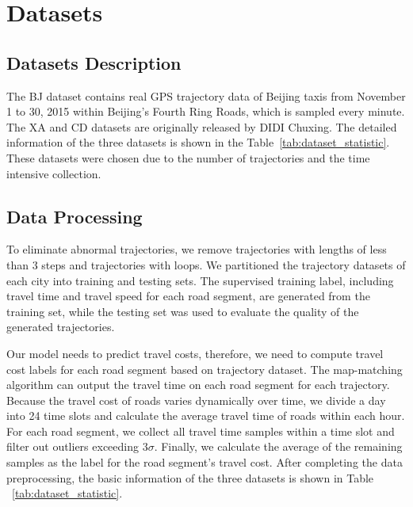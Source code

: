\section{Datasets}
\subsection{Datasets Description}
\label{apdx:data_desc}
The BJ dataset contains real GPS trajectory data of Beijing taxis from November 1 to 30, 2015 within Beijing’s Fourth Ring Roads, which is sampled every minute. The XA and CD datasets are originally released by DIDI Chuxing. The detailed information of the three datasets is shown in the Table~\ref{tab:dataset_statistic}. These datasets were chosen due to the number of trajectories and the time intensive collection.
\begin{table}[t]
  \centering
  \captionsetup{skip=5pt}
    \caption{Datasets Statistics}
    \label{tab:dataset_statistic}
\end{table}

\subsection{Data Processing}
\label{apdx:data_proc}
To eliminate abnormal trajectories, we remove trajectories with lengths of less than 3 steps and trajectories with loops. We partitioned the trajectory datasets of each city into training and testing sets. The supervised training label, including travel time and travel speed for each road segment, are generated from the training set, while the testing set was used to evaluate the quality of the generated trajectories.

Our model needs to predict travel costs, therefore, we need to compute travel cost labels for each road segment based on trajectory dataset. The map-matching algorithm can output the travel time on each road segment for each trajectory. Because the travel cost of roads varies dynamically over time, we divide a day into 24 time slots and calculate the average travel time of roads within each hour. For each road segment, we collect all travel time samples within a time slot and filter out outliers exceeding $3 \sigma $. Finally, we calculate the average of the remaining samples as the label for the road segment's travel cost. After completing the data preprocessing, the basic information of the three datasets is shown in Table ~\ref{tab:dataset_statistic}. 

